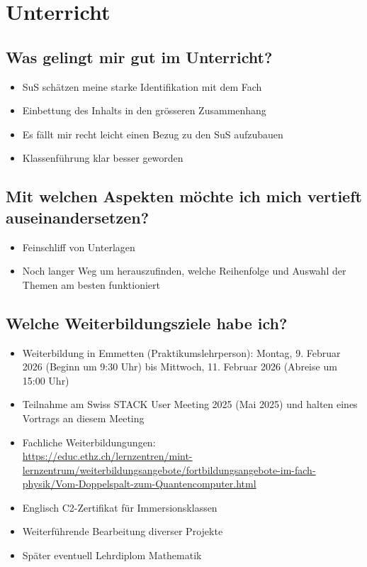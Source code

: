 \clearpage
\section{Unterricht}
\subsection{Was gelingt mir gut im Unterricht?}
\begin{itemize}
	\item SuS schätzen meine starke Identifikation mit dem Fach
	\item Einbettung des Inhalts in den grösseren Zusammenhang
	\item Es fällt mir recht leicht einen Bezug zu den SuS aufzubauen
	\item Klassenführung klar besser geworden
\end{itemize}
\subsection{Mit welchen Aspekten möchte ich mich vertieft auseinandersetzen?}
\begin{itemize}
	\item Feinschliff von Unterlagen
	\item Noch langer Weg um herauszufinden, welche Reihenfolge und Auswahl der Themen am besten funktioniert 
\end{itemize}
\subsection{Welche Weiterbildungsziele habe ich?}
\begin{itemize}
	\item Weiterbildung in Emmetten (Praktikumslehrperson): Montag, 9. Februar 2026 (Beginn um 9:30 Uhr) bis Mittwoch, 11. Februar 2026 (Abreise um 15:00 Uhr)
	\item Teilnahme am Swiss STACK User Meeting 2025 (Mai 2025) und halten eines Vortrags an diesem Meeting
	\item Fachliche Weiterbildungungen:\\
	\url{https://educ.ethz.ch/lernzentren/mint-lernzentrum/weiterbildungsangebote/fortbildungsangebote-im-fach-physik/Vom-Doppelspalt-zum-Quantencomputer.html} 
	\item Englisch C2-Zertifikat für Immersionsklassen
	\item Weiterführende Bearbeitung diverser Projekte
	\item Später eventuell Lehrdiplom Mathematik
\end{itemize}

